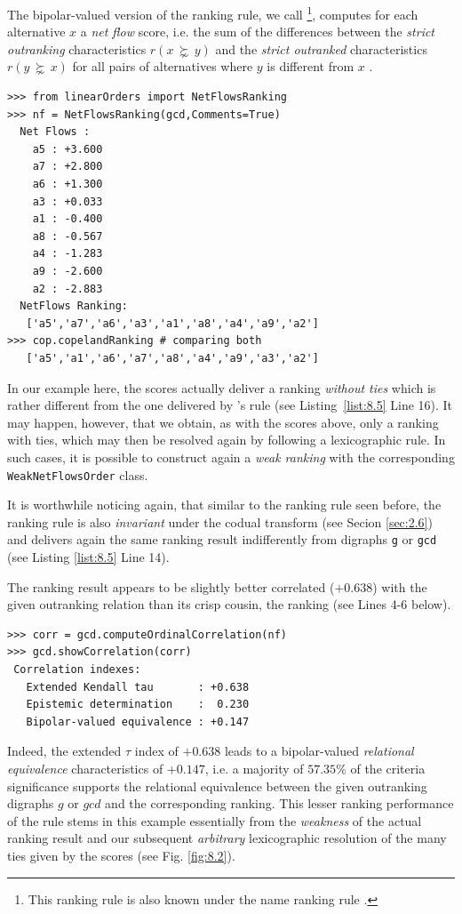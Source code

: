 The bipolar-valued version of the \Copeland ranking rule, we call \NetFlows \footnote{This ranking rule is also known under the name \Promethee ranking rule \citep*{BRA-1985}.}, computes for each alternative $x$ a \emph{net flow} score,  i.e. the sum of the differences between the \emph{strict outranking} characteristics $r(x\, \succnsim \,y)$ and the \emph{strict outranked} characteristics $r(y\, \succnsim \,x)$ for all pairs of alternatives where $y$ is different from $x$ .
  \begin{lstlisting}[caption={Computing a \NetFlows ranking},label=list:8.5]
>>> from linearOrders import NetFlowsRanking
>>> nf = NetFlowsRanking(gcd,Comments=True)
  Net Flows :
    a5 : +3.600
    a7 : +2.800
    a6 : +1.300
    a3 : +0.033
    a1 : -0.400
    a8 : -0.567
    a4 : -1.283
    a9 : -2.600
    a2 : -2.883
  NetFlows Ranking:
   ['a5','a7','a6','a3','a1','a8','a4','a9','a2']
>>> cop.copelandRanking # comparing both
   ['a5','a1','a6','a7','a8','a4','a9','a3','a2']
\end{lstlisting}
In our example here, the \NetFlows scores actually deliver a ranking \emph{without ties} which is rather different from the one delivered by \Copeland 's rule (see Listing~\ref{list:8.5} Line 16). It may happen, however, that we obtain, as with the \Copeland scores above, only a ranking with ties, which may then be resolved again by following a lexicographic rule. In such cases, it is possible to construct again a \emph{weak ranking} with the corresponding \texttt{WeakNetFlowsOrder} class.

It is worthwhile noticing again, that similar to the \Copeland ranking rule seen before, the \NetFlows ranking rule is also \emph{invariant} under the codual transform (see Secion \ref{sec:2.6}) and delivers again the same ranking result indifferently from digraphs \texttt{g} or \texttt{gcd} (see Listing \ref{list:8.5} Line 14). 

The \NetFlows ranking result appears to be slightly better correlated ($+0.638$) with the given outranking relation than its crisp cousin, the \Copeland ranking (see Lines 4-6 below).
\begin{lstlisting}[caption={Checking the quality of the \NetFlows Ranking},label=list:8.6]   
>>> corr = gcd.computeOrdinalCorrelation(nf)
>>> gcd.showCorrelation(corr)
 Correlation indexes:
   Extended Kendall tau       : +0.638
   Epistemic determination    :  0.230
   Bipolar-valued equivalence : +0.147
\end{lstlisting}
Indeed, the extended \Kendall $\tau$ index of $+0.638$ leads to a bipolar-valued \emph{relational equivalence} characteristics of $+0.147$, i.e. a majority of $57.35\%$ of the criteria significance supports the relational equivalence between the given outranking digraphs $g$ or $gcd$  and the corresponding \NetFlows ranking. This lesser ranking performance of the \Copeland rule stems in this example essentially from the \emph{weakness} of the actual ranking result and our subsequent \emph{arbitrary} lexicographic resolution of the many ties given by the \Copeland scores (see Fig. \ref{fig:8.2}).

